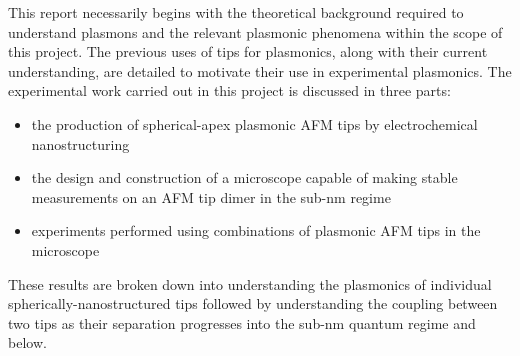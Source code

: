 \documentclass[12pt, a4paper, twoside]{book}
\begin{document}
This report necessarily begins with the theoretical background required to understand plasmons and the relevant plasmonic phenomena within the scope of this project. The previous uses of tips for plasmonics, along with their current understanding, are detailed to motivate their use in experimental plasmonics.
The experimental work carried out in this project is discussed in three parts:
\begin{itemize}
\item the production of spherical-apex plasmonic AFM tips by electrochemical nanostructuring
\item the design and construction of a microscope capable of making stable measurements on an AFM tip dimer in the sub-nm regime
\item experiments performed using combinations of plasmonic AFM tips in the microscope
\end{itemize}
These results are broken down into understanding the plasmonics of individual spherically-nanostructured tips followed by understanding the coupling between two tips as their separation progresses into the sub-nm quantum regime and below.

\ifstandalone
\begin{singlespace}
\fontsize{8pt}{1em}\selectfont
\printbibliography[notcategory=fullcited]
\end{singlespace}
\fi
\end{document}
